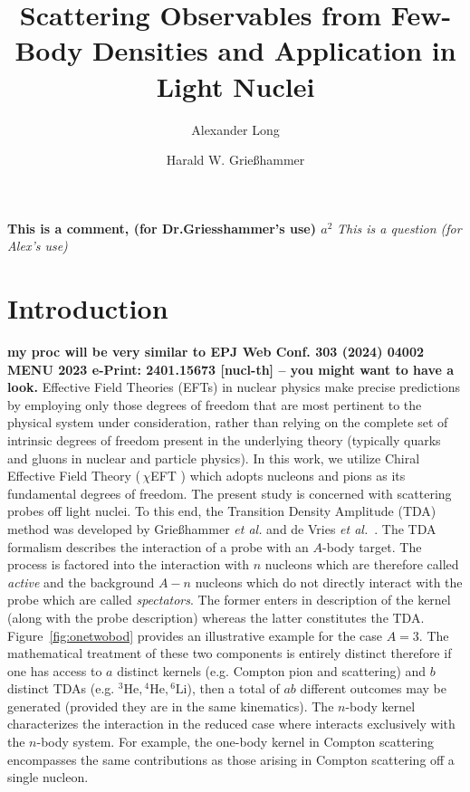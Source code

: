 \documentclass[a4paper,11pt]{article}
\title{Scattering Observables from Few-Body Densities and Application
in Light Nuclei}
\author*{Alexander Long}
\author{Harald W. Grie{\ss}hammer}
\affiliation{Institute for Nuclear Studies, Department of
Physics,\\George Washington University, Washington DC 20052, USA}
\newcommand{\LiS}{{}^{6} \mathrm{Li} }
\newcommand{\HeF}{{}^{4} \mathrm{He}}
\newcommand{\HeT}{{}^{3} \mathrm{He}}
\newcommand{\ques}[1]{\color{red}\textit{ #1 }\color{black}}
\newcommand{\com}[1]{\color{blue}\small\textbf{ #1 }\color{black}\normalsize}
\newcommand{\ChiEFT}{\,$\chi$EFT\,\,}
\begin{document}
\maketitle
\com{This is a comment, (for Dr.Griesshammer's use) $a^2$}
\ques{This is a question (for Alex's use)}
\section{Introduction}
\com{my proc will be very similar to 
    EPJ Web Conf. 303 (2024) 04002
        MENU 2023
e-Print:    2401.15673 [nucl-th] -- you might want to have a look.}
Effective Field Theories (EFTs) in nuclear physics make precise predictions by employing only those
degrees of freedom that are most pertinent to the physical system
under consideration, rather than relying on the complete set of
intrinsic degrees of freedom present in the underlying theory
(typically quarks and gluons in nuclear and particle physics). In this work, we utilize Chiral
Effective Field Theory (\ChiEFT) which adopts nucleons and pions
as its fundamental degrees of freedom.
The present study is concerned with scattering probes off
light nuclei. To this end, the Transition Density Amplitude (TDA)
method was developed by Grie\ss hammer \textit{et al.} and de Vries
\textit{et al.}~\cite{hammer2020, Vries2024}. The TDA formalism
describes the interaction of a probe with an $A$-body target.
The process is factored into the interaction with $n$ nucleons  which are therefore called \textit{active}
and the background $A-n$ nucleons which do not directly interact with the probe which are called \textit{spectators}.
The former enters in description of the kernel (along with the probe description) whereas the latter constitutes the TDA.
Figure~\ref{fig:onetwobod} provides an illustrative
example for the case $A=3$.
The mathematical treatment of these two components is entirely distinct
therefore if one has access to $a$ distinct kernels (e.g. Compton pion and scattering)
and $b$ distinct TDAs (e.g. $\HeT, \HeF, \LiS$), then a total of $ab$ different outcomes may be
generated (provided they are in the same kinematics). 
The $n$-body kernel characterizes the interaction in the reduced case
where interacts exclusively with the $n$-body
system. For example, the one-body kernel in Compton scattering
encompasses the same contributions as those arising in Compton
scattering off a single nucleon. 
\end{document}
